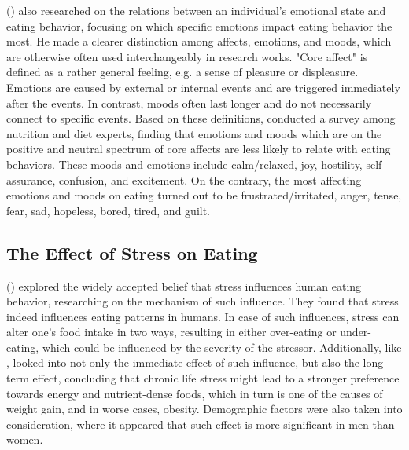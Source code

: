 \noindent \citeauthor{16_martin} (\citeyear{16_martin}) also researched on the relations between an individual's emotional state and eating behavior, focusing on which specific emotions impact eating behavior the most. He made a clearer distinction among affects, emotions, and moods, which are otherwise often used interchangeably in research works. "Core affect" is defined as a rather general feeling, e.g. a sense of pleasure or displeasure. Emotions are caused by external or internal events and are triggered immediately after the events. In contrast, moods often last longer and do not necessarily connect to specific events. Based on these definitions, \citeauthor{16_martin} conducted a survey among nutrition and diet experts, finding that emotions and moods which are on the positive and neutral spectrum of core affects are less likely to relate with eating behaviors. These moods and emotions include calm/relaxed, joy, hostility, self-assurance, confusion, and excitement. On the contrary, the most affecting emotions and moods on eating turned out to be frustrated/irritated, anger, tense, fear, sad, hopeless, bored, tired, and guilt.

\subsection{The Effect of Stress on Eating}
\citeauthor{5_stress_eating} (\citeyear{5_stress_eating}) explored the widely accepted belief that stress influences human eating behavior, researching on the mechanism of such influence. They found that stress indeed influences eating patterns in humans. In case of such influences, stress can alter one's food intake in two ways, resulting in either over-eating or under-eating, which could be influenced by the severity of the stressor. Additionally, like \citeauthor{4_mood_eat}, \citeauthor{5_stress_eating} looked into not only the immediate effect of such influence, but also the long-term effect, concluding that chronic life stress might lead to a stronger preference towards energy and nutrient-dense foods, which in turn is one of the causes of weight gain, and in worse cases, obesity. Demographic factors were also taken into consideration, where it appeared that such effect is more significant in men than women.

